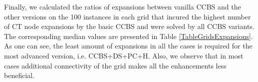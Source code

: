 \documentclass[letterpaper]{article} %
\newcommand{\ccbs}{\ac{CCBS}\xspace}
\newcommand{\ct}{\ac{CT}\xspace}
\begin{document}
Finally, we calculated the ratios of expansions between vanilla CCBS and the other versions
on the 100 instances in each grid that incured the highest number of \ct node expansions by the basic \ccbs and were solved by all \ccbs variants. 
The corresponding median values are presented in Table \ref{TableGridsExpansions}. As one can see, the least amount of expansions in all the cases is required for the most advanced version, i.e. CCBS+DS+PC+H. Also, we observe that in most cases additional connectivity of the grid makes all the enhancements less beneficial. %


\end{document}

